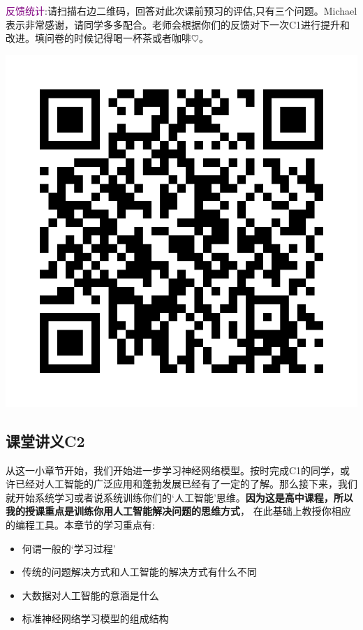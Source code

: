 \documentclass[12pt]{article}
\numberwithin{figure}{section}
\numberwithin{equation}{section}
\begin{document}
\noindent
\textcolor{purple}{反馈统计}:请扫描右边二维码，回答对此次课前预习的评估,只有三个问题。Michael 表示非常感谢，请同学多多配合。老师会根据你们的反馈对下一次C1进行提升和改进。填问卷的时候记得喝一杯茶或者咖啡$\heartsuit$。 \begin{marginfigure}
	\centering
	\includegraphics[width=\textwidth]{fig/C3C1qrcode}
\end{marginfigure}


\newpage

\subsection{课堂讲义C2}

从这一小章节开始，我们开始进一步学习神经网络模型。按时完成C1的同学，或许已经对人工智能的广泛应用和蓬勃发展已经有了一定的了解。那么接下来，我们就开始系统学习或者说系统训练你们的`人工智能’思维。\textbf{因为这是高中课程，所以我的授课重点是训练你用人工智能解决问题的思维方式}， 在此基础上教授你相应的编程工具。本章节的学习重点有:
\begin{itemize}
	\item 何谓一般的`学习过程’
	\item 传统的问题解决方式和人工智能的解决方式有什么不同
	\item 大数据对人工智能的意涵是什么
	\item 标准神经网络学习模型的组成结构
\end{itemize}
\end{document}
